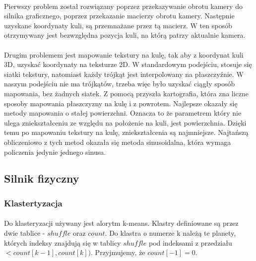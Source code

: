 \paragraph{}

Pierwszy problem został rozwiązany poprzez przekazywanie obrotu kamery do silnika graficznego, poprzez przekazanie macierzy obrotu kamery. Następnie uzyskane koordynaty kuli, są przemnażane przez tą macierz. W ten sposób otrzymywany jest bezwzględna pozycja kuli, na którą patrzy aktualnie kamera.

\paragraph{}

Drugim problemem jest mapowanie tekstury na kulę, tak aby z koordynat kuli 3D, uzyskać koordynaty na teksturze 2D. W standardowym podejściu, stosuje się siatki tekstury, natomiast każdy trójkąt jest interpolowany na płaszczyźnie. W naszym podejściu nie ma trójkątów, trzeba więc było uzyskać ciągły sposób mapowania, bez żadnych siatek. Z pomocą przyszła kartografia, która zna liczne sposoby mapowania płaszczyzny na kulę i z powrotem. Najlepsze okazały się metody mapowania o stałej powierzchni. Oznacza to że parametrem który nie ulega zniekształceniu ze względu na położenie na kuli, jest powierzchnia. Dzięki temu po mapowaniu tekstury na kulę, zniekształcenia są najmniejsze. Najtańszą obliczeniowo z tych metod okazała się metoda sinusoidalna, która wymaga policzenia jedynie jednego sinusa.


\subsection{Silnik fizyczny}

\subsubsection{Klastertyzacja}

\paragraph{} Do klasteryzacji używany jest alorytm k-means. Klastry definiowane są przez dwie tablice - \ensuremath{shuffle} oraz \ensuremath{count}. Do klastra o numerze k należą te planety, których indeksy znajdują się w tablicy \ensuremath{shuffle} pod indeksami z przedziału \ensuremath{< count[k-1], count[k] )}. Przyjmujemy, że \ensuremath{count[-1] = 0}.


